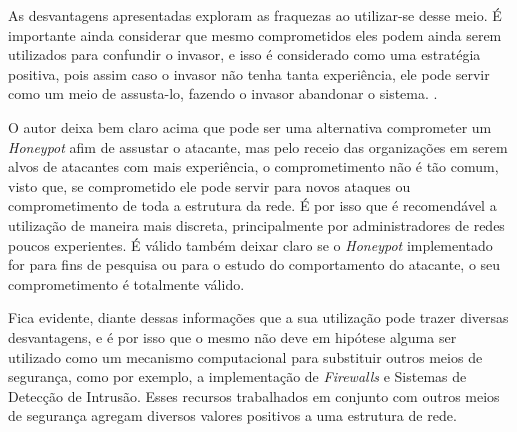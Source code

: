 As desvantagens apresentadas exploram as fraquezas ao utilizar-se desse meio. É importante ainda considerar que mesmo comprometidos eles podem ainda serem utilizados para confundir o invasor, e isso é considerado como uma estratégia positiva, pois assim caso o invasor não tenha tanta experiência, ele pode servir como um meio de assusta-lo, fazendo o invasor abandonar o sistema. \cite{mohammed2015}.

O autor deixa bem claro acima que pode ser uma alternativa comprometer um \textit{Honeypot} afim de assustar o atacante, mas pelo receio das organizações em serem alvos de atacantes com mais experiência, o comprometimento não é tão comum, visto que, se comprometido ele pode servir para novos ataques ou comprometimento de toda a estrutura da rede. É por isso que é recomendável a utilização de maneira mais discreta, principalmente por administradores de redes poucos experientes. É válido também deixar claro se o \textit{Honeypot} implementado for para fins de pesquisa ou para o estudo do comportamento do atacante, o seu comprometimento é totalmente válido.

Fica evidente, diante dessas informações que a sua utilização pode trazer diversas desvantagens, e é por isso que o mesmo não deve em hipótese alguma ser utilizado como um mecanismo computacional para substituir outros meios de segurança, como por exemplo, a implementação de \textit{Firewalls} e Sistemas de Detecção de Intrusão. Esses recursos trabalhados em conjunto com outros meios de segurança agregam diversos valores positivos a uma estrutura de rede.

